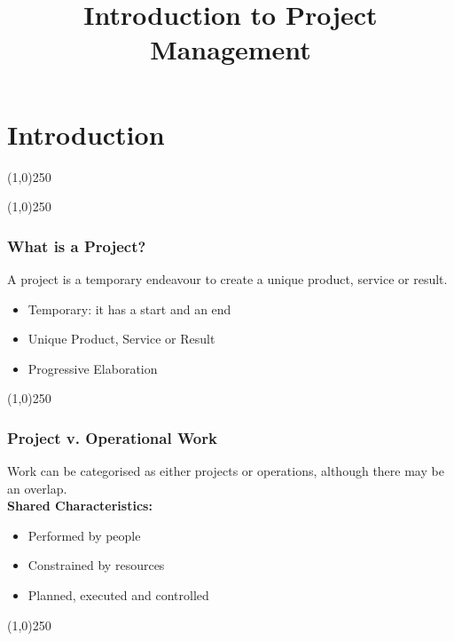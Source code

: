 



%
\title[Introduction to Project Management]{Introduction to Project Management}



%
\usetikzlibrary{arrows}



\newpage




\thispagestyle{empty}
\tableofcontents
\newpage
\section{Introduction}


\begin{frame}
\titlepage
\end{frame}\begin{center}\line(1,0){250}\end{center}
%
%
\begin{center}\line(1,0){250}\end{center}



\begin{frame}
\frametitle{What is a Project?}
A project is a temporary endeavour to create a unique product, service or result.\\
\begin{itemize}
\item Temporary: it has a start and an end
\item Unique Product, Service or Result
\item Progressive Elaboration
\end{itemize}
\end{frame}
\begin{center}\line(1,0){250}\end{center}







\begin{frame}
\frametitle{Project v. Operational Work}
Work can be categorised as either projects or operations, although there may be an overlap.\\
\textbf{Shared Characteristics:}\\
\begin{itemize}
\item Performed by people
\item Constrained by resources
\item Planned, executed and controlled
\end{itemize}
\end{frame}
\begin{center}\line(1,0){250}\end{center}



